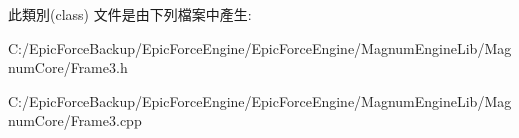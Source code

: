 此類別(class) 文件是由下列檔案中產生\+:\begin{DoxyCompactItemize}
\item 
C\+:/\+Epic\+Force\+Backup/\+Epic\+Force\+Engine/\+Epic\+Force\+Engine/\+Magnum\+Engine\+Lib/\+Magnum\+Core/Frame3.\+h\item 
C\+:/\+Epic\+Force\+Backup/\+Epic\+Force\+Engine/\+Epic\+Force\+Engine/\+Magnum\+Engine\+Lib/\+Magnum\+Core/Frame3.\+cpp\end{DoxyCompactItemize}

